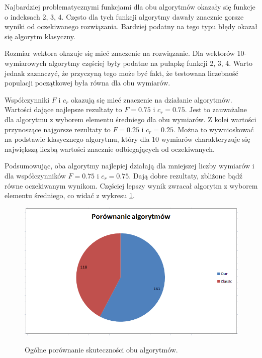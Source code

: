 \documentclass[a4paper]{article}
\begin{document}
Najbardziej problematycznymi funkcjami dla obu algorytmów okazały się funkcje o indeksach 2, 3, 4. Często dla tych funkcji algorytmy dawały znacznie gorsze wyniki od oczekiwanego rozwiązania. Bardziej podatny na tego typu błędy okazał się algorytm klasyczny. 

Rozmiar wektora okazuje się mieć znaczenie na rozwiązanie. Dla wektorów 10-wymiarowych algorytmy częściej były podatne na pułapkę funkcji 2, 3, 4. Warto jednak zaznaczyć, że przyczyną tego może być fakt, że testowana liczebność populacji początkowej była równa dla obu wymiarów. 

Współczynniki $F$ i $c_r$ okazują się mieć znaczenie na działanie algorytmów. Wartości dające najlepsze rezultaty to $F=0.75$ i $c_r=0.75$. Jest to zauważalne dla algorytmu z wyborem elementu średniego dla obu wymiarów. Z kolei wartości przynoszące najgorsze rezultaty to $F=0.25$ i $c_r=0.25$. Można to wywnioskować na podstawie klasycznego algorytmu, który dla 10 wymiarów charakteryzuje się największą liczbą wartości znacznie odbiegających od oczekiwanych.

Podsumowując, oba algorytmy najlepiej działają dla mniejszej liczby wymiarów i dla współczynników $F=0.75$ i $c_r=0.75$. Dają dobre rezultaty, zbliżone bądź równe oczekiwanym wynikom. Częściej lepszy wynik zwracał algorytm z wyborem elementu średniego, co widać z wykresu \ref{rys:statystyka}.

\begin{figure}[!h]
\centering
\includegraphics[width=\textwidth]{statystyka.png}
\label{rys:statystyka}
\caption{Ogólne porównanie skuteczności obu algorytmów.}
\end{figure}
\end{document}
